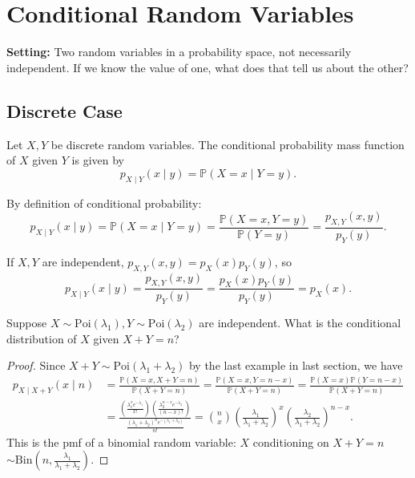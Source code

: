 \chapter{Conditional Random Variables}
\textbf{Setting:} Two random variables in a probability space, not necessarily independent. If we know the value of one, what does that tell us about the other?

\section{Discrete Case}
\begin{definition}
    Let \(X, Y\) be discrete random variables. The conditional probability mass function of \(X\) given \(Y\) is given by 
    \[
        p_{X \mid Y} (x \mid y) = \mathbb{P} (X = x \mid Y = y).
    \]   
\end{definition}

By definition of conditional probability:
\[
    p_{X \mid Y}(x \mid y) = \mathbb{P} (X = x \mid Y = y) = \frac{\mathbb{P} (X = x, Y = y)}{\mathbb{P} (Y = y)} = \frac{p_{X, Y}(x, y)}{p_Y(y)}.
\]

If \(X, Y\) are independent, \(p_{X, Y}(x, y) = p_X(x) p_Y(y) \), so 
\[
    p_{X \mid Y} (x \mid y) = \frac{p_{X, Y}(x, y)}{p_Y(y)} = \frac{p_X(x) p_Y(y)}{p_Y(y)} = p_X(x).
\]

\begin{eg}
    Suppose \(X \sim \mathrm{Poi} (\lambda _1), Y \sim \mathrm{Poi}(\lambda _2)  \) are independent. What is the conditional distribution of \(X\) given \(X + Y = n\)?  
\end{eg}

\begin{proof}
    Since \(X+Y \sim \mathrm{Poi}(\lambda _1 + \lambda _2) \) by the last example in last section, we have 
    \begin{align*}
        p_{X \mid X + Y}(x \mid n) &= \frac{\mathbb{P} (X = x, X + Y = n)}{\mathbb{P} (X + Y = n)} = \frac{\mathbb{P} (X = x, Y = n - x)}{\mathbb{P} (X + Y = n)} = \frac{\mathbb{P} (X = x) \mathbb{P} (Y = n - x)}{\mathbb{P} (X + Y = n)} \\
        &= \frac{\left( \frac{\lambda _1^x e^{-\lambda _1}}{x!} \right) \left( \frac{\lambda _2^{n - x} e^{-\lambda _2}}{(n - x)!} \right)  }{\frac{(\lambda _1 + \lambda _2)^n e^{-(\lambda _1 + \lambda _2)}}{n!}} = \binom{n}{x} \left( \frac{\lambda _1}{\lambda _1 + \lambda _2} \right)^x \left( \frac{\lambda _2}{\lambda _1 + \lambda _2} \right)^{n-x}.  
    \end{align*}
    This is the pmf of a binomial random variable: \(X\) conditioning on \(X + Y = n\) \(\sim \mathrm{Bin}\left( n, \frac{\lambda _1}{\lambda _1 + \lambda _2} \right)  \).    
\end{proof}

